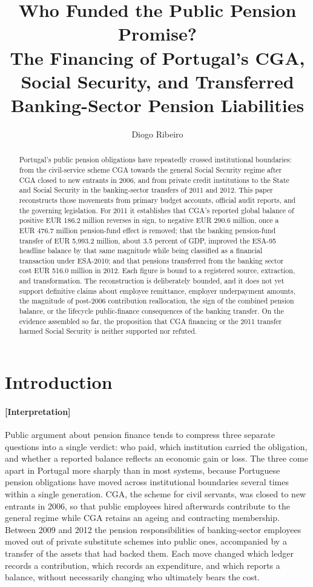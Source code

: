 \documentclass[11pt]{article}
\title{Who Funded the Public Pension Promise?\\\large The Financing of Portugal's CGA, Social Security, and Transferred Banking-Sector Pension Liabilities}
\author{Diogo Ribeiro}
\date{}
\begin{document}
\maketitle

\begin{abstract}
Portugal's public pension obligations have repeatedly crossed institutional boundaries: from the civil-service scheme CGA towards the general Social Security regime after CGA closed to new entrants in 2006, and from private credit institutions to the State and Social Security in the banking-sector transfers of 2011 and 2012. This paper reconstructs those movements from primary budget accounts, official audit reports, and the governing legislation. For 2011 it establishes that CGA's reported global balance of positive EUR 186.2 million reverses in sign, to negative EUR 290.6 million, once a EUR 476.7 million pension-fund effect is removed; that the banking pension-fund transfer of EUR 5,993.2 million, about 3.5 percent of GDP, improved the ESA-95 headline balance by that same magnitude while being classified as a financial transaction under ESA-2010; and that pensions transferred from the banking sector cost EUR 516.0 million in 2012. Each figure is bound to a registered source, extraction, and transformation. The reconstruction is deliberately bounded, and it does not yet support definitive claims about employee remittance, employer underpayment amounts, the magnitude of post-2006 contribution reallocation, the sign of the combined pension balance, or the lifecycle public-finance consequences of the banking transfer. On the evidence assembled so far, the proposition that CGA financing or the 2011 transfer harmed Social Security is neither supported nor refuted.
\end{abstract}

\section{Introduction}
\label{sec:introduction}
\paragraph{[Interpretation]}
Public argument about pension finance tends to compress three separate questions into a single verdict: who paid, which institution carried the obligation, and whether a reported balance reflects an economic gain or loss. The three come apart in Portugal more sharply than in most systems, because Portuguese pension obligations have moved across institutional boundaries several times within a single generation. CGA, the scheme for civil servants, was closed to new entrants in 2006, so that public employees hired afterwards contribute to the general regime while CGA retains an ageing and contracting membership. Between 2009 and 2012 the pension responsibilities of banking-sector employees moved out of private substitute schemes into public ones, accompanied by a transfer of the assets that had backed them. Each move changed which ledger records a contribution, which records an expenditure, and which reports a balance, without necessarily changing who ultimately bears the cost.
\end{document}
